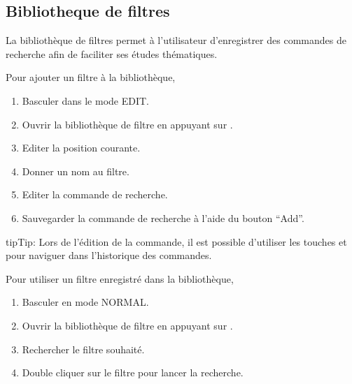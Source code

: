 \documentclass[letterpaper,10pt,english]{sphinxmanual}
\begin{document}
\subsection{Bibliotheque de filtres}
\label{\detokenize{annexe_filtres:bibliotheque-de-filtres}}
\sphinxAtStartPar
La bibliothèque de filtres permet à l’utilisateur d’enregistrer des commandes de recherche
afin de faciliter ses études thématiques.

\sphinxAtStartPar
Pour ajouter un filtre à la bibliothèque,
\begin{enumerate}
%
\item {} 
\sphinxAtStartPar
Basculer dans le mode EDIT.

\item {} 
\sphinxAtStartPar
Ouvrir la bibliothèque de filtre en appuyant sur .

\item {} 
\sphinxAtStartPar
Editer la position courante.

\item {} 
\sphinxAtStartPar
Donner un nom au filtre.

\item {} 
\sphinxAtStartPar
Editer la commande de recherche.

\item {} 
\sphinxAtStartPar
Sauvegarder la commande de recherche à l’aide du bouton “Add”.

\end{enumerate}

\begin{sphinxadmonition}{tip}{Tip:}
\sphinxAtStartPar
Lors de l’édition de la commande, il est possible d’utiliser les touches
 et  pour naviguer dans l’historique des commandes.
\end{sphinxadmonition}

\sphinxAtStartPar
Pour utiliser un filtre enregistré dans la bibliothèque,
\begin{enumerate}
%
\item {} 
\sphinxAtStartPar
Basculer en mode NORMAL.

\item {} 
\sphinxAtStartPar
Ouvrir la bibliothèque de filtre en appuyant sur .

\item {} 
\sphinxAtStartPar
Rechercher le filtre souhaité.

\item {} 
\sphinxAtStartPar
Double cliquer sur le filtre pour lancer la recherche.

\end{enumerate}
\end{document}
